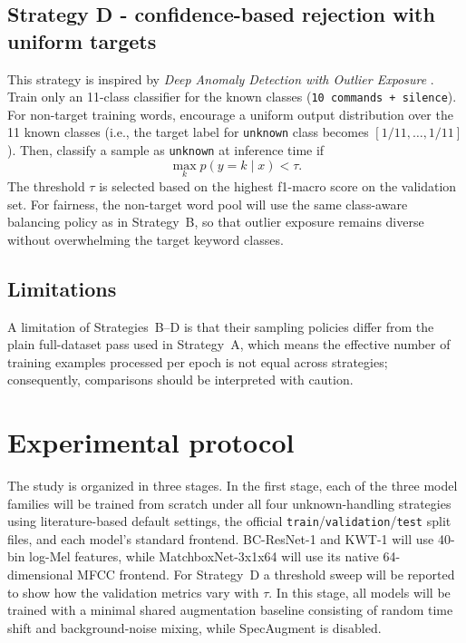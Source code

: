 \documentclass[11pt]{article}
\begin{document}
\subsection*{Strategy D - confidence-based rejection with uniform targets}

This strategy is inspired by \textit{Deep Anomaly Detection with Outlier Exposure} \cite{oe}.
\\

Train only an 11-class classifier for the known classes (\texttt{10 commands + silence}). For non-target training words, encourage a uniform output distribution over the 11 known classes (i.e., the target label for \texttt{unknown} class becomes \([1/11, \dots, 1/11]\)). Then, classify a sample as \texttt{unknown} at inference time if
\[
\max_k p(y = k \mid x) < \tau.
\]
The threshold \(\tau\) is selected based on the highest f1-macro score on the validation set. For fairness, the non-target word pool will use the same class-aware balancing policy as in Strategy~B, so that outlier exposure remains diverse without overwhelming the target keyword classes.

\subsection*{Limitations}

A limitation of Strategies~B--D is that their sampling policies differ from the plain full-dataset pass used in Strategy~A, which means the effective number of training examples processed per epoch is not equal across strategies; consequently, comparisons should be interpreted with caution.

\section{Experimental protocol}

The study is organized in three stages. In the first stage, each of the three model families will be trained from scratch under all four unknown-handling strategies using literature-based default settings, the official \texttt{train}/\texttt{validation}/\texttt{test} split files, and each model's standard frontend. BC-ResNet-1 and KWT-1 will use 40-bin log-Mel features, while MatchboxNet-3x1x64 will use its native 64-dimensional MFCC frontend. For Strategy~D a threshold sweep will be reported to show how the validation metrics vary with \(\tau\). In this stage, all models will be trained with a minimal shared augmentation baseline consisting of random time shift and background-noise mixing, while SpecAugment is disabled.
\end{document}
